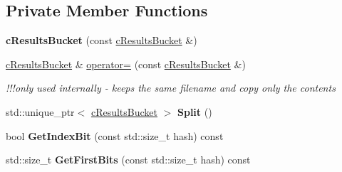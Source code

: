 \subsection*{Private Member Functions}
\begin{DoxyCompactItemize}
\item 
\hypertarget{classresultsDB_1_1cResultsBucket_a38e798e137591db9b45f74383b06e86e}{{\bfseries c\-Results\-Bucket} (const \hyperlink{classresultsDB_1_1cResultsBucket}{c\-Results\-Bucket} \&)}\label{classresultsDB_1_1cResultsBucket_a38e798e137591db9b45f74383b06e86e}

\item 
\hypertarget{classresultsDB_1_1cResultsBucket_afff806e1e24a90c60174893b0288307f}{\hyperlink{classresultsDB_1_1cResultsBucket}{c\-Results\-Bucket} \& \hyperlink{classresultsDB_1_1cResultsBucket_afff806e1e24a90c60174893b0288307f}{operator=} (const \hyperlink{classresultsDB_1_1cResultsBucket}{c\-Results\-Bucket} \&)}\label{classresultsDB_1_1cResultsBucket_afff806e1e24a90c60174893b0288307f}

\begin{DoxyCompactList}\small\item\em !!!only used internally -\/ keeps the same filename and copy only the contents \end{DoxyCompactList}\item 
\hypertarget{classresultsDB_1_1cResultsBucket_af8fa946826308b7353d5d9b2ba839257}{std\-::unique\-\_\-ptr$<$ \hyperlink{classresultsDB_1_1cResultsBucket}{c\-Results\-Bucket} $>$ {\bfseries Split} ()}\label{classresultsDB_1_1cResultsBucket_af8fa946826308b7353d5d9b2ba839257}

\item 
\hypertarget{classresultsDB_1_1cResultsBucket_ae5ea37bc3749dd9efe24d71c5081299a}{bool {\bfseries Get\-Index\-Bit} (const std\-::size\-\_\-t hash) const }\label{classresultsDB_1_1cResultsBucket_ae5ea37bc3749dd9efe24d71c5081299a}

\item 
\hypertarget{classresultsDB_1_1cResultsBucket_ae0c6adba5349cf2b13150f1db7f62637}{std\-::size\-\_\-t {\bfseries Get\-First\-Bits} (const std\-::size\-\_\-t hash) const }\label{classresultsDB_1_1cResultsBucket_ae0c6adba5349cf2b13150f1db7f62637}

\end{DoxyCompactItemize}
